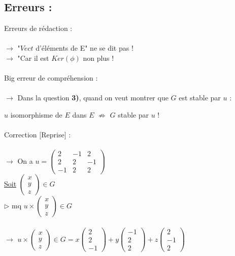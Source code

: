 \documentclass{book}
\begin{document}
\subsection{Erreurs :}

Erreurs de rédaction : \\ \\
$\rightarrow$ "$Vect$ d'éléments de E" ne se dit pas ! \\
$\rightarrow$ "Car il est $Ker(\phi)$ non plus ! \\ \\
 
Big erreur de compréhension : \\ \\
$\rightarrow$ Dans la question \textbf{3)}, quand on veut montrer que $G$ est stable par $u$ :

$u$ isomorphisme de $E$ dans $E$ $\not \Rightarrow$ $G$ stable par $u$ ! \\ \\

\hspace{2cm} Correction $[$Reprise$]$ : \\ \\
$\rightarrow$ On a $u =
\begin{pmatrix}
	2 & -1 & 2 \\
	2 & 2 & -1 \\
	-1 & 2 & 2	
\end{pmatrix}$ \\

\underline{Soit} $\begin{pmatrix} x \\ y \\ z \end{pmatrix} \in G$ \\
$\rhd$ mq $u \times \begin{pmatrix} x \\ y \\ z \end{pmatrix} \in G$ \\ \\
$\rightarrow$ $u \times \begin{pmatrix} x \\ y \\ z \end{pmatrix} \in G = x \begin{pmatrix} 2 \\ 2 \\ -1 \end{pmatrix} + y \begin{pmatrix} -1 \\ 2 \\ 2 \end{pmatrix} + z \begin{pmatrix} 2 \\ -1 \\ 2 \end{pmatrix}$
\end{document}

